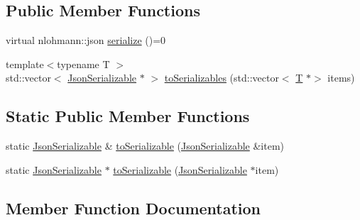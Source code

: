 \subsection*{Public Member Functions}
\begin{DoxyCompactItemize}
\item 
virtual nlohmann\+::json \mbox{\hyperlink{class_beer_engine_1_1_json_serializable_a17689cbd8fe282c570bd026cc1be5b3b}{serialize}} ()=0
\item 
{\footnotesize template$<$typename T $>$ }\\std\+::vector$<$ \mbox{\hyperlink{class_beer_engine_1_1_json_serializable}{Json\+Serializable}} $\ast$ $>$ \mbox{\hyperlink{class_beer_engine_1_1_json_serializable_a80649111ff7da289151d17201f9e1d19}{to\+Serializables}} (std\+::vector$<$ \mbox{\hyperlink{namespace_beer_engine_a94f0b552f6dc910de8cdb44207981f53a8de48e594408f9fc561b2f68ce05f664}{T}} $\ast$$>$ items)
\end{DoxyCompactItemize}
\subsection*{Static Public Member Functions}
\begin{DoxyCompactItemize}
\item 
static \mbox{\hyperlink{class_beer_engine_1_1_json_serializable}{Json\+Serializable}} \& \mbox{\hyperlink{class_beer_engine_1_1_json_serializable_a48f83f0e913d9a7f4962f30ac8ff450b}{to\+Serializable}} (\mbox{\hyperlink{class_beer_engine_1_1_json_serializable}{Json\+Serializable}} \&item)
\item 
static \mbox{\hyperlink{class_beer_engine_1_1_json_serializable}{Json\+Serializable}} $\ast$ \mbox{\hyperlink{class_beer_engine_1_1_json_serializable_ae56f6be872da47edbb9a1f25a2eccc0e}{to\+Serializable}} (\mbox{\hyperlink{class_beer_engine_1_1_json_serializable}{Json\+Serializable}} $\ast$item)
\end{DoxyCompactItemize}


\subsection{Member Function Documentation}
\mbox{\label{class_beer_engine_1_1_json_serializable_a17689cbd8fe282c570bd026cc1be5b3b}} 

